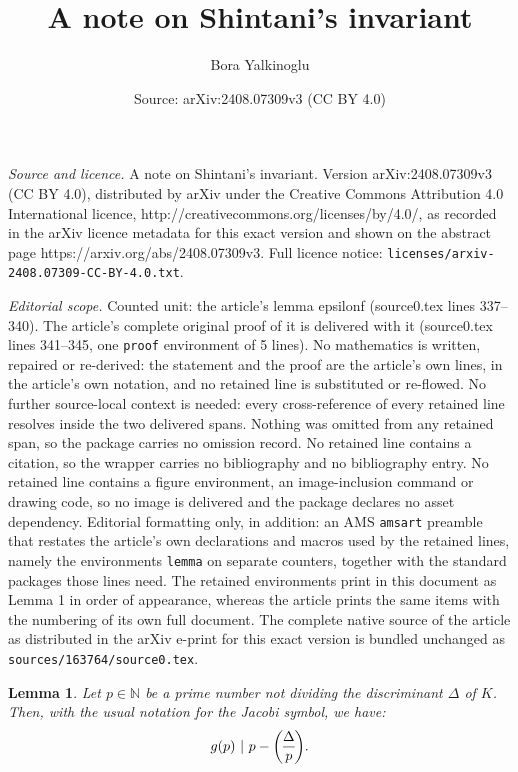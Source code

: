 \documentclass[10pt,a4paper]{amsart}
\title{A note on Shintani's invariant}
\author{Bora Yalkinoglu}
\date{Source: arXiv:2408.07309v3 (CC BY 4.0)}
\newtheorem{lemma}{Lemma}
\newcommand{\eq}[1]{\begin{equation}#1\end{equation}}
\newcommand{\genlegendre}[4]{%
  \genfrac{(}{)}{}{#1}{#3}{#4}%
  \if\relax\detokenize{#2}\relax\else_{\!#2}\fi
}
\newcommand{\legendre}[3][]{\genlegendre{}{#1}{#2}{#3}}
\begin{document}
\maketitle

\noindent\emph{Source and licence.} A note on Shintani's invariant. Version arXiv:2408.07309v3 (CC BY 4.0), distributed by arXiv under the Creative Commons Attribution 4.0 International licence, http://creativecommons.org/licenses/by/4.0/, as recorded in the arXiv licence metadata for this exact version and shown on the abstract page https://arxiv.org/abs/2408.07309v3. Full licence notice: \texttt{licenses/arxiv-2408.07309-CC-BY-4.0.txt}.\par\smallskip

\noindent\textit{Editorial scope.} Counted unit: the article's lemma epsilonf (source0.tex lines 337--340). The article's complete original proof of it is delivered with it (source0.tex lines 341--345, one \texttt{proof} environment of 5 lines). No mathematics is written, repaired or re-derived: the statement and the proof are the article's own lines, in the article's own notation, and no retained line is substituted or re-flowed.  No further source-local context is needed: every cross-reference of every retained line resolves inside the two delivered spans.  Nothing was omitted from any retained span, so the package carries no omission record.  No retained line contains a citation, so the wrapper carries no bibliography and no bibliography entry.  No retained line contains a figure environment, an image-inclusion command or drawing code, so no image is delivered and the package declares no asset dependency.  Editorial formatting only, in addition: an AMS \texttt{amsart} preamble that restates the article's own declarations and macros used by the retained lines, namely the environments \texttt{lemma} on separate counters, together with the standard packages those lines need.  The retained environments print in this document as Lemma 1 in order of appearance, whereas the article prints the same items with the numbering of its own full document.  The complete native source of the article as distributed in the arXiv e-print for this exact version is bundled unchanged as \texttt{sources/163764/source0.tex}.
\begin{lemma}
\label{epsilonf}
Let $p \in \mathbb N$ be a prime number not dividing the discriminant $\Delta$ of $K$. Then, with the usual notation for the Jacobi symbol, we have: \eq{g(p) \ \vert \ p-\legendre{\Delta}{p}.}
\end{lemma}
\end{document}
